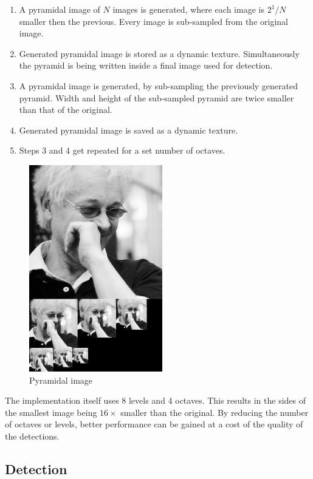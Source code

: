 \begin{enumerate}
	\item A pyramidal image of $N$ images is generated, where each image is $2^1/N$ smaller then the previous. Every image is sub-sampled from the original image.
	\item Generated pyramidal image is stored as a dynamic texture. Simultaneously the pyramid is being written inside a final image used for detection.
	\item A pyramidal image is generated, by sub-sampling the previously generated pyramid. Width and height of the sub-sampled pyramid are twice smaller than that of the original.
	\item Generated pyramidal image is saved as a dynamic texture.
	\item Steps 3 and 4 get repeated for a set number of octaves.
\end{enumerate}

\begin{center}
\begin{figure}[ht]
	\centering\includegraphics[height=9cm]{fig/pyramid.jpg}
	\caption{Pyramidal image}
\end{figure}
\end{center}

The implementation itself uses 8 levels and 4 octaves. This results in the sides of the smallest image being $16 \times$ smaller than the original. By reducing the number of octaves or levels, better performance can be gained at a cost of the quality of the detections.

\subsection{Detection}

